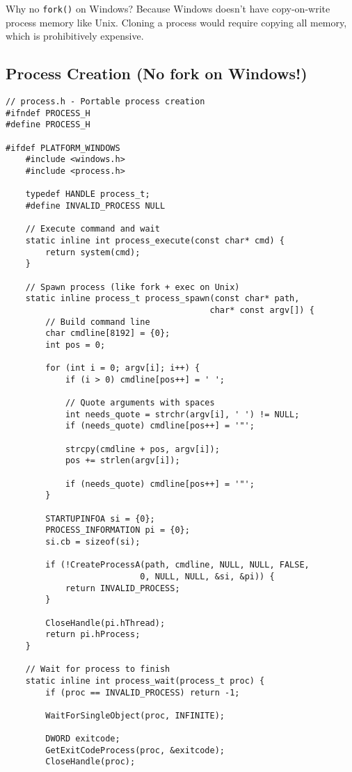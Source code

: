 Why no \texttt{fork()} on Windows? Because Windows doesn't have copy-on-write process memory like Unix. Cloning a process would require copying all memory, which is prohibitively expensive.

\subsection{Process Creation (No fork on Windows!)}

\begin{lstlisting}
// process.h - Portable process creation
#ifndef PROCESS_H
#define PROCESS_H

#ifdef PLATFORM_WINDOWS
    #include <windows.h>
    #include <process.h>

    typedef HANDLE process_t;
    #define INVALID_PROCESS NULL

    // Execute command and wait
    static inline int process_execute(const char* cmd) {
        return system(cmd);
    }

    // Spawn process (like fork + exec on Unix)
    static inline process_t process_spawn(const char* path,
                                         char* const argv[]) {
        // Build command line
        char cmdline[8192] = {0};
        int pos = 0;

        for (int i = 0; argv[i]; i++) {
            if (i > 0) cmdline[pos++] = ' ';

            // Quote arguments with spaces
            int needs_quote = strchr(argv[i], ' ') != NULL;
            if (needs_quote) cmdline[pos++] = '"';

            strcpy(cmdline + pos, argv[i]);
            pos += strlen(argv[i]);

            if (needs_quote) cmdline[pos++] = '"';
        }

        STARTUPINFOA si = {0};
        PROCESS_INFORMATION pi = {0};
        si.cb = sizeof(si);

        if (!CreateProcessA(path, cmdline, NULL, NULL, FALSE,
                           0, NULL, NULL, &si, &pi)) {
            return INVALID_PROCESS;
        }

        CloseHandle(pi.hThread);
        return pi.hProcess;
    }

    // Wait for process to finish
    static inline int process_wait(process_t proc) {
        if (proc == INVALID_PROCESS) return -1;

        WaitForSingleObject(proc, INFINITE);

        DWORD exitcode;
        GetExitCodeProcess(proc, &exitcode);
        CloseHandle(proc);


\end{lstlisting}
